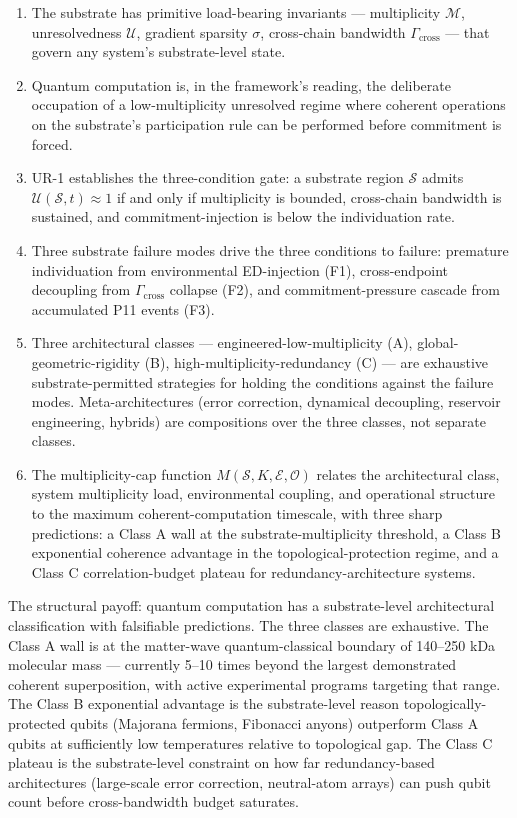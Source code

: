 \documentclass[11pt,a4paper]{article}
\begin{document}
\begin{enumerate}[noitemsep]
  \item The substrate has primitive load-bearing invariants --- multiplicity $\mathcal{M}$, unresolvedness $\mathcal{U}$, gradient sparsity $\sigma$, cross-chain bandwidth $\Gamma_{\mathrm{cross}}$ --- that govern any system's substrate-level state.
  \item Quantum computation is, in the framework's reading, the deliberate occupation of a low-multiplicity unresolved regime where coherent operations on the substrate's participation rule can be performed before commitment is forced.
  \item UR-1 establishes the three-condition gate: a substrate region $\mathcal{S}$ admits $\mathcal{U}(\mathcal{S}, t) \approx 1$ if and only if multiplicity is bounded, cross-chain bandwidth is sustained, and commitment-injection is below the individuation rate.
  \item Three substrate failure modes drive the three conditions to failure: premature individuation from environmental ED-injection (F1), cross-endpoint decoupling from $\Gamma_{\mathrm{cross}}$ collapse (F2), and commitment-pressure cascade from accumulated P11 events (F3).
  \item Three architectural classes --- engineered-low-multiplicity (A), global-geometric-rigidity (B), high-multiplicity-redundancy (C) --- are exhaustive substrate-permitted strategies for holding the conditions against the failure modes. Meta-architectures (error correction, dynamical decoupling, reservoir engineering, hybrids) are compositions over the three classes, not separate classes.
  \item The multiplicity-cap function $M(\mathcal{S}, K, \mathcal{E}, \mathcal{O})$ relates the architectural class, system multiplicity load, environmental coupling, and operational structure to the maximum coherent-computation timescale, with three sharp predictions: a Class A wall at the substrate-multiplicity threshold, a Class B exponential coherence advantage in the topological-protection regime, and a Class C correlation-budget plateau for redundancy-architecture systems.
\end{enumerate}

The structural payoff: quantum computation has a substrate-level architectural classification with falsifiable predictions. The three classes are exhaustive. The Class A wall is at the matter-wave quantum-classical boundary of 140--250 kDa molecular mass --- currently 5--10 times beyond the largest demonstrated coherent superposition, with active experimental programs targeting that range. The Class B exponential advantage is the substrate-level reason topologically-protected qubits (Majorana fermions, Fibonacci anyons) outperform Class A qubits at sufficiently low temperatures relative to topological gap. The Class C plateau is the substrate-level constraint on how far redundancy-based architectures (large-scale error correction, neutral-atom arrays) can push qubit count before cross-bandwidth budget saturates.
\end{document}
